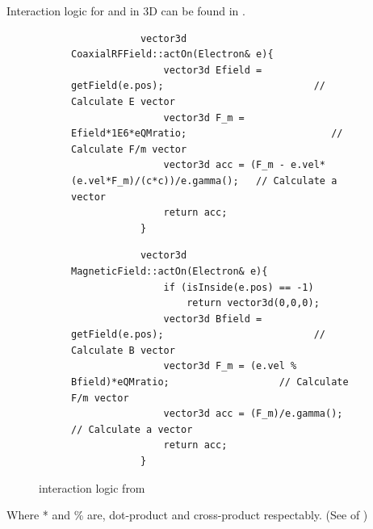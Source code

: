 \documentclass[a4paper,oneside,12pt]{report}
\numberwithin{equation}{chapter}
\begin{document}
Interaction logic for \eE and \eB in 3D can be found in .
\begin{figure}[H]
    \captionsetup[subfigure]{justification=centering}
    \captionsetup{justification=centering}
    \begin{subfigure}{\textwidth}
        \begin{verbatim}
            vector3d CoaxialRFField::actOn(Electron& e){
                vector3d Efield = getField(e.pos);                          // Calculate E vector
                vector3d F_m = Efield*1E6*eQMratio;                         // Calculate F/m vector
                vector3d acc = (F_m - e.vel*(e.vel*F_m)/(c*c))/e.gamma();   // Calculate a vector
                return acc;
            }
        \end{verbatim}
    \end{subfigure}

    \begin{subfigure}{\textwidth}
        \begin{verbatim}
            vector3d MagneticField::actOn(Electron& e){
                if (isInside(e.pos) == -1)
                    return vector3d(0,0,0);
                vector3d Bfield = getField(e.pos);                          // Calculate B vector
                vector3d F_m = (e.vel % Bfield)*eQMratio;                   // Calculate F/m vector
                vector3d acc = (F_m)/e.gamma();                             // Calculate a vector
                return acc;
            }
        \end{verbatim}
    \end{subfigure}
    \caption{\eEM  interaction logic from }
    \label{fig:3D_e_EM_interaction_first}
\end{figure}
Where * and \% are, dot-product and cross-product respectably. (See  of )
\end{document}
